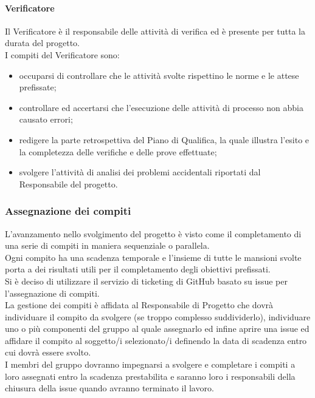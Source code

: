 			\paragraph{Verificatore  }
				Il Verificatore è il responsabile delle attività di verifica ed è presente per tutta la durata del progetto. \\
				I compiti del Verificatore sono:\\
				\begin{itemize}
					\item occuparsi di controllare che le attività svolte rispettino le norme e le attese prefissate;
					\item controllare ed accertarsi che l’esecuzione delle attività di processo non abbia causato errori;
					\item redigere la parte retrospettiva del Piano di Qualifica, la quale illustra l’esito e la completezza delle verifiche e delle prove effettuate;
					\item svolgere l’attività di analisi dei problemi accidentali riportati dal Responsabile del progetto.
				\end{itemize}
		\subsubsection{Assegnazione dei compiti}
			L’avanzamento nello svolgimento del progetto è visto come il completamento di una serie di compiti in maniera sequenziale o parallela. \\
			Ogni compito ha una scadenza temporale e l’insieme di tutte le mansioni svolte porta a dei risultati utili per il completamento degli obiettivi prefissati.\\
			Si è deciso di utilizzare il servizio di ticketing di GitHub basato su issue per l’assegnazione di compiti.\\
			La gestione dei compiti è affidata al Responsabile di Progetto che dovrà individuare il compito da svolgere (se troppo complesso suddividerlo), individuare uno o più componenti del gruppo al quale assegnarlo ed infine aprire una issue ed affidare il compito al soggetto/i selezionato/i definendo la data di scadenza entro cui dovrà essere svolto.\\
			I membri del gruppo dovranno impegnarsi a svolgere e completare i compiti a loro assegnati entro la scadenza prestabilita e saranno loro i responsabili della chiusura della issue quando avranno terminato il lavoro.\\
